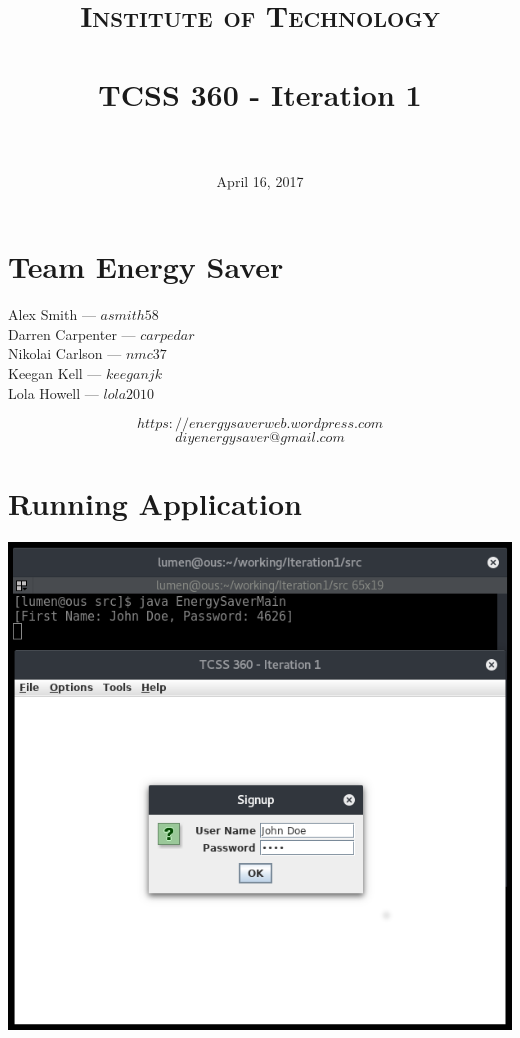 \documentclass[paper=a4, fontsize=11pt]{scrartcl} %
\title{	
\normalfont \normalsize 
\textsc{Institute of Technology} \\ [25pt] %
\horrule{0.5pt} \\[0.4cm] %
\huge TCSS 360 - Iteration 1 \\ %
\horrule{2pt} \\[0.5cm] %
}
\date{April 16, 2017} %
\numberwithin{equation}{section} %
\numberwithin{figure}{section} %
\numberwithin{table}{section} %
\begin{document}
\maketitle %

\thispagestyle{empty}
\section{Team Energy Saver}
\begin{center}
Alex Smith --- $asmith58$\\
Darren Carpenter --- $carpedar$\\
Nikolai Carlson --- $nmc37$\\
Keegan Kell --- $keeganjk$\\
Lola Howell --- $lola2010$\\
\end{center}

$$https://energysaverweb.wordpress.com$$
$$diyenergysaver@gmail.com$$

\clearpage
\section{Running Application}
\begin{center}
\includegraphics[scale=0.45]{signup.png}
\end{center}
\end{document}
